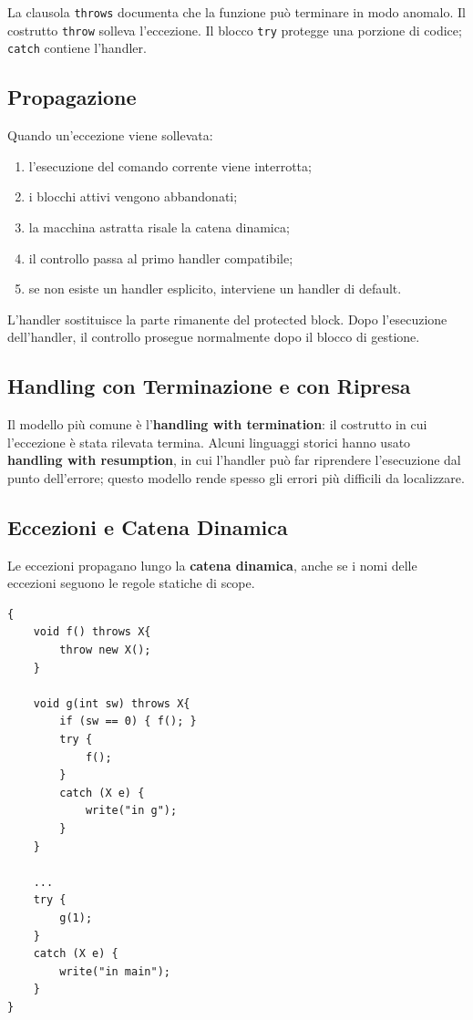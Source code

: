 \documentclass{article}
\begin{document}
La clausola \texttt{throws} documenta che la funzione può terminare in modo anomalo. Il costrutto \texttt{throw} solleva l'eccezione. Il blocco \texttt{try} protegge una porzione di codice; \texttt{catch} contiene l'handler.

\subsection{Propagazione}

Quando un'eccezione viene sollevata:
\begin{enumerate}
  \item l'esecuzione del comando corrente viene interrotta;
  \item i blocchi attivi vengono abbandonati;
  \item la macchina astratta risale la catena dinamica;
  \item il controllo passa al primo handler compatibile;
  \item se non esiste un handler esplicito, interviene un handler di default.
\end{enumerate}

L'handler sostituisce la parte rimanente del protected block. Dopo l'esecuzione dell'handler, il controllo prosegue normalmente dopo il blocco di gestione.

\subsection{Handling con Terminazione e con Ripresa}

Il modello più comune è l'\textbf{handling with termination}: il costrutto in cui l'eccezione è stata rilevata termina. Alcuni linguaggi storici hanno usato \textbf{handling with resumption}, in cui l'handler può far riprendere l'esecuzione dal punto dell'errore; questo modello rende spesso gli errori più difficili da localizzare.

\subsection{Eccezioni e Catena Dinamica}

Le eccezioni propagano lungo la \textbf{catena dinamica}, anche se i nomi delle eccezioni seguono le regole statiche di scope.

\begin{lstlisting}
{
    void f() throws X{
        throw new X();
    }

    void g(int sw) throws X{
        if (sw == 0) { f(); }
        try {
            f();
        }
        catch (X e) {
            write("in g");
        }
    }

    ...
    try {
        g(1);
    }
    catch (X e) {
        write("in main");
    }
}
\end{lstlisting}
\end{document}
